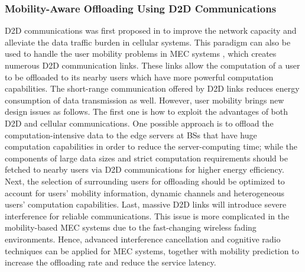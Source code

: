 \documentclass[journal]{IEEEtran}
\begin{document}
{\subsubsection{\textbf{Mobility-Aware Offloading Using D2D Communications}}
D2D communications was first proposed in \cite{doppler2009device} to improve the network capacity and alleviate the data traffic burden in cellular systems. This paradigm can also be used to handle the user mobility problems in MEC systems \cite{li2014exploring}, which creates numerous D2D communication links. These links allow the computation of a user to be offloaded to its nearby users which have more powerful computation capabilities. The short-range communication offered by D2D links reduces energy consumption of data transmission as well. However, user mobility brings new  design issues as follows. The first one is how to exploit the advantages of both D2D and cellular communications. One possible approach is to offload the computation-intensive data to the edge servers at BSs that have huge computation capabilities in order to reduce the server-computing time; while the components of large data sizes and strict computation requirements should be fetched to nearby users via D2D communications for higher energy efficiency. Next, the selection of surrounding users for offloading should be optimized to account for users' mobility information, dynamic channels and heterogeneous users' computation capabilities. Last, massive D2D links will introduce severe interference for reliable communications. This issue is more complicated in the mobility-based MEC systems due to the fast-changing wireless fading environments. Hence, advanced interference cancellation and cognitive radio techniques can be applied for MEC systems, together with mobility prediction to increase the offloading rate and reduce the service latency.

}
\end{document}

